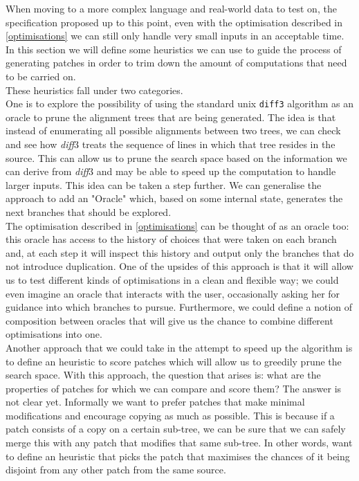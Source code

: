 \documentclass[11pt, titlepage]{article}
\newcommand{\diff}{\emph{diff}}
\begin{document}
When moving to a more complex language and real-world data to test on, the specification proposed up to this point, even with the optimisation described in \ref{optimisations} we can still only handle very small inputs in an acceptable time.
\\
In this section we will define some heuristics we can use to guide the process of generating patches in order to trim down the amount of computations that need to be carried on.
\\
These heuristics fall under two categories.
\\
One is to explore the possibility of using the standard unix \texttt{diff3} algorithm as an oracle to prune the alignment trees that are being generated. 
The idea is that instead of enumerating all possible alignments between two trees, we can check and see how \diff3 treats the sequence of lines in which that tree resides in the source. This can allow us to prune the search space based on the information we can derive from \diff3 and may be able to speed up the computation to handle larger inputs. This idea can be taken a step further. We can generalise the approach to add an "Oracle" which, based on some internal state, generates the next branches that should be explored.
\\
The optimisation described in \ref{optimisations} can be thought of as an oracle too: 
this oracle has access to the history of choices that were taken on each branch and, at each step it will inspect this history and output only the branches that do not introduce duplication.
One of the upsides of this approach is that it will allow us to test different kinds of optimisations in a clean and flexible way; we could even imagine an oracle that interacts with the 
user, occasionally asking her for guidance into which branches to pursue. 
Furthermore, we could define a notion of composition between oracles that will give us the chance to combine different optimisations into one.
\\
Another approach that we could take in the attempt to speed up the algorithm is to define an heuristic to score patches which will allow us to greedily prune the search space. 
With this approach, the question that arises is: what are the properties of patches for which we can compare and score them? The answer is not clear yet. Informally we want to prefer patches that make minimal modifications and encourage copying as much as possible. This is because 
if a patch consists of a copy on a certain sub-tree, we can be sure that we can 
safely merge this with any patch that modifies that same sub-tree. 
In other words, want to define an heuristic that picks the patch that maximises the chances of it being disjoint from any other patch from the same source.
\\
\end{document}
